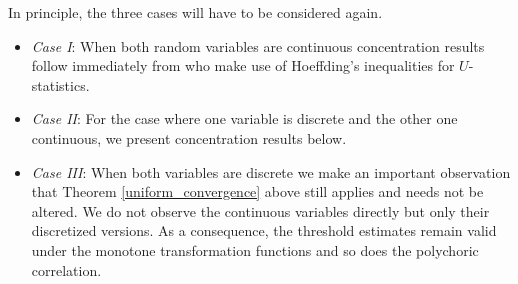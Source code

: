 In principle, the three cases will have to be considered again.
\begin{itemize}
    \item \textit{Case I}: When both random variables are continuous concentration results follow immediately from \citet{Liu12} who make use of Hoeffding's inequalities for $U$-statistics.
    \item \textit{Case II}: For the case where one variable is discrete and the other one continuous, we present concentration results below.
    \item \textit{Case III}: When both variables are discrete we make an important observation that Theorem \ref{uniform_convergence} above still applies and needs not be altered. We do not observe the continuous variables directly but only their discretized versions. As a consequence, the threshold estimates remain valid under the monotone transformation functions and so does the polychoric correlation.
\end{itemize}

